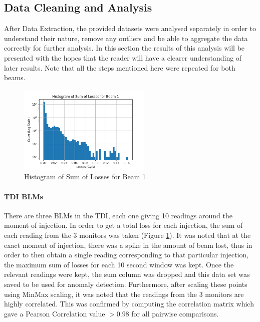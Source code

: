 \documentclass[conference, a4paper]{IEEEtran}
\begin{document}
	\subsection{Data Cleaning and Analysis}
	\label{sec::Data_Cleaning_and_Analysis}
	\par After Data Extraction, the provided datasets were analysed separately in order to understand their nature, remove any outliers and be able to aggregate the data correctly for further analysis. In this section the results of this analysis will be presented with the hopes that the reader will have a clearer understanding of later results. Note that all the steps mentioned here were repeated for both beams.

		\begin{figure}[!b]
		\centering
		\includegraphics[width=2.5in]{Histogram_of_Sum_of_Beam_Losses}
		\caption[BLM Histogram]{Histogram of Sum of Losses for Beam 1}
		\label{fig::TDI_BLM_hist}
	\end{figure}

	\paragraph{TDI BLMs}There are three BLMs in the TDI, each one giving 10 readings around the moment of injection. In order to get a total loss for each injection, the sum of each reading from the 3 monitors was taken (Figure \ref{fig::TDI_BLM_hist}). It was noted that at the exact moment of injection, there was a spike in the amount of beam lost, thus in order to then obtain a single reading corresponding to that particular injection, the maximum sum of losses for each 10 second window was kept. Once the relevant readings were kept, the sum column was dropped and this data set was saved to be used for anomaly detection. Furthermore, after scaling these points using MinMax scaling, it was noted that the readings from the 3 monitors are highly correlated. This was confirmed by computing the correlation matrix which gave a Pearson Correlation value $> 0.98$ for all pairwise comparisons. 
	
\end{document}
